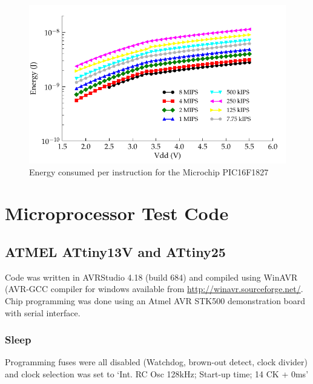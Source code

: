 \begin{figure}
\begin{centering}
\includegraphics{content/appendices/microprocessorPowerMeasurements/graphics/Graph_PIC16F1827_Clock_JPI}
\par\end{centering}

\protect\caption{
\label{fig:16F1827ClkJPI}Energy consumed per instruction for the
Microchip PIC16F1827
}


\end{figure}



\section{Microprocessor Test Code}


\subsection{ATMEL ATtiny13V and ATtiny25}

Code was written in AVRStudio 4.18 (build 684) and compiled using
WinAVR (AVR-GCC compiler for windows available from \url{http://winavr.sourceforge.net/}.
Chip programming was done using an Atmel AVR STK500 demonstration
board with serial interface.


\subsubsection*{Sleep}

Programming fuses were all disabled (Watchdog, brown-out detect, clock
divider) and clock selection was set to `Int. RC Osc 128kHz; Start-up
time; 14 CK + 0ms'

